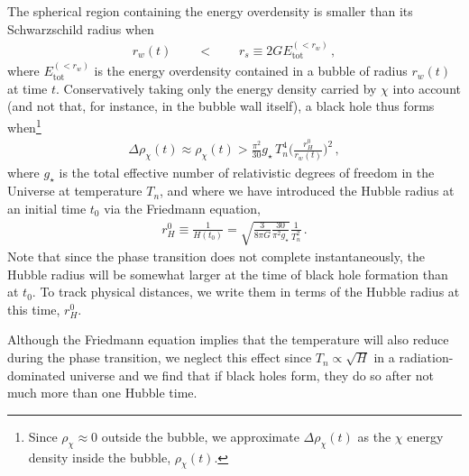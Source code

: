 \documentclass[
onecolumn, %
11pt, %
tightenlines,
superscriptaddress, %
nofootinbib, %
preprintnumbers, %
prd %
]{revtex4-1}
\begin{document}
The spherical region containing the energy overdensity is smaller than its Schwarzschild radius  when
%
\begin{align}
    r_w(t) \qquad < \qquad
    r_s \equiv 2 G E_\text{tot}^{(<r_w)} \,,
    \label{eq:rs}
\end{align}
%
where $E_\text{tot}^{(<r_w)}$ is the energy overdensity contained in a bubble of radius $r_w(t)$ at time $t$.  Conservatively taking only the energy density carried by $\chi$ into account (and not that, for instance, in the bubble wall itself), a black hole thus forms when\footnote{Since $\rho_\chi \approx 0$ outside the bubble, we approximate $\Delta\rho_\chi(t)$ as the $\chi$ energy density inside the bubble, $\rho_\chi(t)$.}
%
\begin{align}
    \Delta\rho_\chi(t) \approx \rho_\chi(t) > \frac{\pi^2}{30} g_\star\,T_n^4 \bigg(\frac{r_H^0}{r_w(t)}\bigg)^{\!2} \,,
    \label{eq:schwarzschild}
\end{align}
%
where $g_\star$ is the total effective number of relativistic degrees of freedom in the Universe at temperature $T_n$, and where we have introduced the Hubble radius at an initial time $t_0$ via the Friedmann equation,
%
\begin{align}
    r_H^0 \equiv \frac{1}{H(t_0)} = \sqrt{\frac{3}{8\pi G} \frac{30}{\pi^2 g_\star}}
                        \frac{1}{T_n^2} \,.
\end{align}
%
Note that since the phase transition does not complete instantaneously, the Hubble radius will be somewhat larger at the time of black hole formation than at $t_0$.  To track physical distances, we write them in terms of the Hubble radius at this time, $r_H^0$.

Although the Friedmann equation implies that the temperature will also reduce during the phase transition, we neglect this effect since $T_n \propto \sqrt{H}$ in a radiation-dominated universe and we find that if black holes form, they do so after not much more than one Hubble time.
\end{document}

